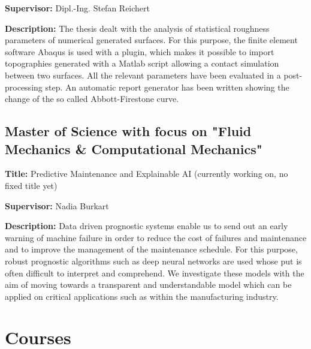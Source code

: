 \documentclass[11pt,a4paper,sans]{moderncv}        %
\begin{document}
\textbf{Supervisor:} Dipl.-Ing. Stefan Reichert \newline

\textbf{Description:} The thesis dealt with the analysis of statistical roughness parameters of numerical generated surfaces. For this purpose, the finite element software Abaqus is used with a plugin, which makes it possible to import topographies generated with a Matlab script allowing a contact simulation between two surfaces. All the relevant parameters have been evaluated in a post-processing step. An automatic report generator has been written showing the change of the so called Abbott-Firestone curve.

\vspace{6pt}

\subsection{Master of Science with focus on "Fluid Mechanics \& Computational Mechanics" \qquad \qquad}

\vspace{3pt}

\textbf{Title:} Predictive Maintenance and Explainable AI (currently working on, no fixed title yet) \newline

\textbf{Supervisor:} Nadia Burkart \newline

\textbf{Description:} Data driven prognostic systems enable us to send out an early warning of machine failure in order to reduce the cost of failures and maintenance and to improve the management of the maintenance schedule. For this purpose, robust prognostic algorithms such as deep neural networks are used whose put is often difficult to interpret and comprehend. We investigate these models with the aim of moving towards a transparent and understandable model which can be applied on critical applications such as within the manufacturing industry.

\vspace{6pt}

\section{Courses}
\end{document}
